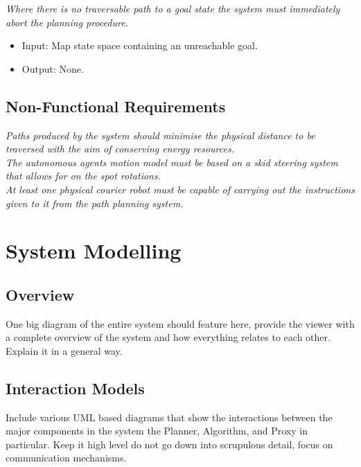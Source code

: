 \noindent
\textit{Where there is no traversable path to a goal state the system must immediately abort the planning procedure.} 
\begin{itemize}
\item Input: Map state space containing an unreachable goal. 
\item Output: None. \\
\end{itemize}

\newpage

\subsection{Non-Functional Requirements}

\noindent
\textit{Paths produced by the system should minimise the physical distance to be traversed with the aim of conserving energy resources.} \\

\noindent
\textit{The autonomous agents motion model must be based on a skid steering system that allows for on the spot rotations.} \\

\noindent
\textit{At least one physical courier robot must be capable of carrying out the instructions given to it from the path planning system.} \\

\newpage


\section{System Modelling}

\subsection{Overview}
One big diagram of the entire system should feature here, provide the viewer with a complete overview of the system and how everything relates to each other. Explain it in a general way.

\subsection{Interaction Models}
Include various UML based diagrams that show the interactions between the major components in the system the Planner, Algorithm, and Proxy in particular. Keep it high level do not go down into scrupulous detail, focus on communication mechanisms. 

